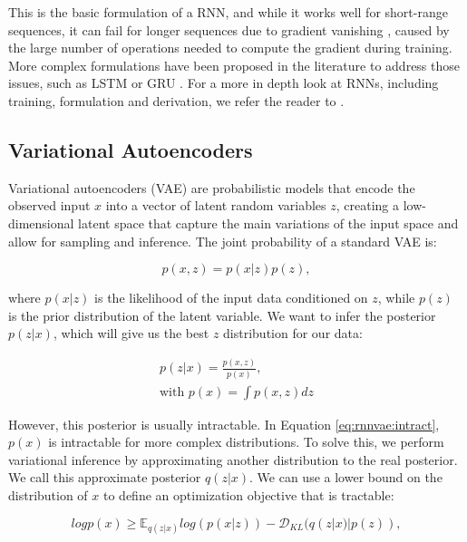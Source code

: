 This is the basic formulation of a RNN, and while it works well for short-range sequences, it can fail for longer sequences due to gradient vanishing \cite{Hochreiter1998}, caused by the large number of operations needed to compute the gradient during training. More complex formulations have been proposed in the literature to address those issues, such as LSTM \cite{Hochreiter1997} or GRU \cite{Chung2014}. For a more in depth look at RNNs, including training, formulation and derivation, we refer the reader to \cite{Sherstinsky2020}.  \\

\subsection{Variational Autoencoders}

Variational autoencoders (VAE) are probabilistic models that encode the observed input $x$ into a vector of latent random variables $z$, creating a low-dimensional latent space that capture the main variations of the input space and allow for sampling and inference. The joint probability of a standard VAE is:

\begin{equation}
    p(x,z) = p(x|z)p(z),
\end{equation}

where $p(x|z)$ is the likelihood of the input data conditioned on $z$, while $p(z)$ is the prior distribution of the latent variable. We want to infer the posterior $p(z|x)$, which will give us the best $z$ distribution for our data:

\begin{equation} \label{eq:rnnvae:intract}
\begin{split}
p(z|x) = \frac{p(x,z)}{p(x)}, \\
\text{with } p(x) = \int p(x,z) dz
\end{split}
\end{equation}

However, this posterior is usually intractable. In Equation \ref{eq:rnnvae:intract}, $p(x)$ is intractable for more complex distributions. To solve this, we perform variational inference by approximating another distribution to the real posterior. We call this approximate posterior $q(z|x)$. We can use a lower bound on the distribution of $x$ to define an optimization objective that is tractable: 

\begin{equation}
    log p(x) \geq \mathbb{E}_{q(z|x)} log(p(x|z)) - \mathcal{D}_{KL}(q(z|x)|p(z)),
\end{equation}

